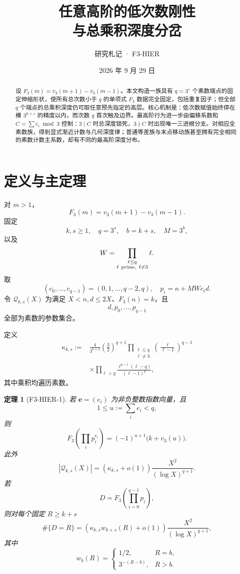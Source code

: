 \documentclass[11pt,a4paper]{ctexart}
\title{\bfseries 任意高阶的低次数刚性\\与总乘积深度分岔}
\author{研究札记 · F3-HIER}
\date{2026 年 9 月 29 日}
\newtheorem{theorem}{定理}
\newcommand{\Fthree}{F_3}
\newcommand{\vthree}{v_3}
\begin{document}
\maketitle
\begin{abstract}
设 \(F_3(m)=v_3(m+1)-v_3(m-1)\)。本文构造一族具有 \(q=3^s\) 个素数端点的固定伸缩形状，使所有总次数小于 \(q\) 的单项式 \(F_3\) 数据完全固定，包括重复因子；但全部 \(q\) 个端点的总乘积深度仍可取任意预先指定的高层。核心机制是：低次数赋值始终停在模 \(3^{k+s}\) 的精度以内，而次数 \(q\) 首次触及边界。最高阶行为进一步由偏移系数和 \(C=\sum c_i\bmod3\) 控制：\(3\mid C\) 时总深度锁死，\(3\nmid C\) 时出现唯一三进根分支。对相应全素数族，得到显式渐近计数与几何深度律；普通等差族与末点移动族甚至拥有完全相同的素数计数主系数，却有不同的最高阶深度分布。
\end{abstract}

\section{定义与主定理}
对 \(m>1\)，
\[
\Fthree(m)=\vthree(m+1)-\vthree(m-1).
\]
固定
\[
k,s\ge1,\quad q=3^s,\quad b=k+s,\quad M=3^b,
\]
以及
\[
W=\prod_{\substack{\ell\le q\\ \ell\ {\rm prime},\ \ell\ne3}}\ell.
\]
取
\[
(c_0,\ldots,c_{q-1})=(0,1,\ldots,q-2,q),
\quad p_i=n+MWc_i d.
\]
令 \(\mathcal Q_{k,s}(X)\) 为满足 \(X<n,d\le2X\)、\(F_3(n)=k\)，且
\[
d,p_0,\ldots,p_{q-1}
\]
全部为素数的参数集合。

定义
\[
\begin{aligned}
\kappa_{k,s}:={}&
\frac4{3^{k+2}}\left(\frac32\right)^{q+1}
\prod_{\substack{\ell\le q\\\ell\ne3}}
\left(\frac{\ell}{\ell-1}\right)^{q-1}\\
&\times
\prod_{\ell>q}
\frac{\ell^{q-1}(\ell-q)}{(\ell-1)^q},
\end{aligned}
\]
其中乘积均遍历素数。

\begin{theorem}[F3-HIER-1]
若 \(\mathbf e=(e_i)\) 为非负整数指数向量，且
\[
1\le u:=\sum_i e_i<q,
\]
则
\[
\boxed{
\Fthree\!\left(\prod_i p_i^{e_i}\right)
=(-1)^{u+1}\bigl(k+\vthree(u)\bigr).
}
\]
此外
\[
|\mathcal Q_{k,s}(X)|
=
(\kappa_{k,s}+o(1))
\frac{X^2}{(\log X)^{q+1}}.
\]
若
\[
D=\Fthree\!\left(\prod_{i=0}^{q-1}p_i\right),
\]
则对每个固定 \(R\ge k+s\)
\[
\#\{D=R\}
=
(\kappa_{k,s}w_{k+s}(R)+o(1))
\frac{X^2}{(\log X)^{q+1}},
\]
其中
\[
w_b(R)=
\begin{cases}
1/2,&R=b,\\
3^{-(R-b)},&R>b.
\end{cases}
\]
\end{theorem}
\end{document}
